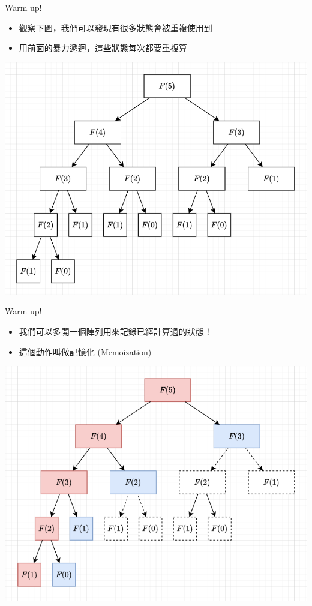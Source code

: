 \documentclass[aspectratio=169]{beamer}
\begin{document}
    \begin{frame}{Warm up!}
        \begin{itemize}
            \item 觀察下圖，我們可以發現有很多狀態會被重複使用到
            \item<2-> 用前面的暴力遞迴，這些狀態每次都要重複算
        \end{itemize}
        \begin{center}
            \includegraphics[scale=0.35]{images/fibonacci_tree.png}
        \end{center}
    \end{frame}
    
    \begin{frame}{Warm up!}
        \begin{itemize}
            \item 我們可以多開一個陣列用來記錄已經計算過的狀態！
            \item<2-> 這個動作叫做記憶化 (Memoization)
        \end{itemize}
        \begin{center}
            \includegraphics[scale=0.35]{images/fibonacci_memo.png}
        \end{center}
    \end{frame}
\end{document}
